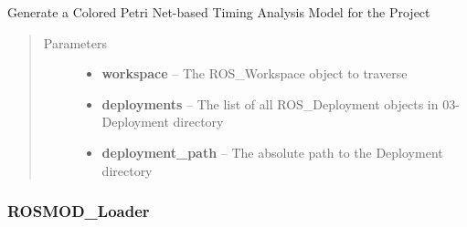 \documentclass[letterpaper,10pt,english]{sphinxmanual}
\begin{document}
\begin{fulllineitems}
\begin{fulllineitems}
\begin{quote}
\begin{description}
\end{description}\end{quote}

\end{fulllineitems}


\begin{fulllineitems}
\label{class_Generator:ROSMOD_Generator.generate_cpn}
Generate a Colored Petri Net-based Timing Analysis Model for the Project
\begin{quote}\begin{description}
\item[{Parameters}] \leavevmode\begin{itemize}
\item {} 
\textbf{workspace} -- The ROS\_Workspace object to traverse

\item {} 
\textbf{deployments} -- The list of all ROS\_Deployment objects in 03-Deployment directory

\item {} 
\textbf{deployment\_path} -- The absolute path to the Deployment directory

\end{itemize}

\end{description}\end{quote}

\end{fulllineitems}


\end{fulllineitems}



\subsubsection{ROSMOD\_Loader}
\label{class_Loader::doc}\label{class_Loader:rosmod-loader}
\end{document}
